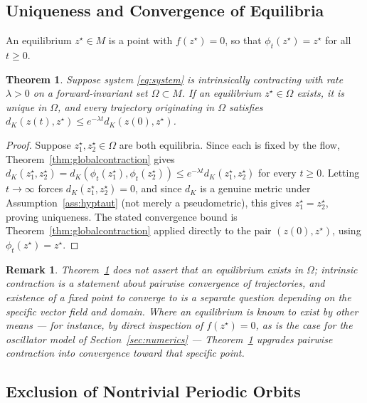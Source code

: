 \documentclass[preprint,12pt,authoryear]{elsarticle}
\newtheorem{theorem}{Theorem}
\newtheorem{remark}{Remark}
\newtheorem{proof}{Proof}
\begin{document}
\subsection{Uniqueness and Convergence of Equilibria}

An equilibrium $z^\star\in M$ is a point with $f(z^\star)=0$, so that $\phi_t(z^\star)=z^\star$ for all $t\ge0$.

\begin{theorem}
\label{thm:equilibrium}
Suppose system \eqref{eq:system} is intrinsically contracting with rate $\lambda>0$ on a forward-invariant set $\Omega\subset M$. If an equilibrium $z^\star\in\Omega$ exists, it is unique in $\Omega$, and every trajectory originating in $\Omega$ satisfies $d_K(z(t),z^\star)\le e^{-\lambda t}d_K(z(0),z^\star)$.
\end{theorem}

\begin{proof}
Suppose $z_1^\star,z_2^\star\in\Omega$ are both equilibria. Since each is fixed by the flow, Theorem~\ref{thm:globalcontraction} gives $d_K(z_1^\star,z_2^\star)=d_K(\phi_t(z_1^\star),\phi_t(z_2^\star))\le e^{-\lambda t}d_K(z_1^\star,z_2^\star)$ for every $t\ge0$. Letting $t\to\infty$ forces $d_K(z_1^\star,z_2^\star)=0$, and since $d_K$ is a genuine metric under Assumption~\ref{ass:hyptaut} (not merely a pseudometric), this gives $z_1^\star=z_2^\star$, proving uniqueness. The stated convergence bound is Theorem~\ref{thm:globalcontraction} applied directly to the pair $(z(0),z^\star)$, using $\phi_t(z^\star)=z^\star$.
\end{proof}

\begin{remark}
Theorem~\ref{thm:equilibrium} does not assert that an equilibrium exists in $\Omega$; intrinsic contraction is a statement about pairwise convergence of trajectories, and existence of a fixed point to converge to is a separate question depending on the specific vector field and domain. Where an equilibrium is known to exist by other means — for instance, by direct inspection of $f(z^\star)=0$, as is the case for the oscillator model of Section~\ref{sec:numerics} — Theorem~\ref{thm:equilibrium} upgrades pairwise contraction into convergence toward that specific point.
\end{remark}

\subsection{Exclusion of Nontrivial Periodic Orbits}
\end{document}
